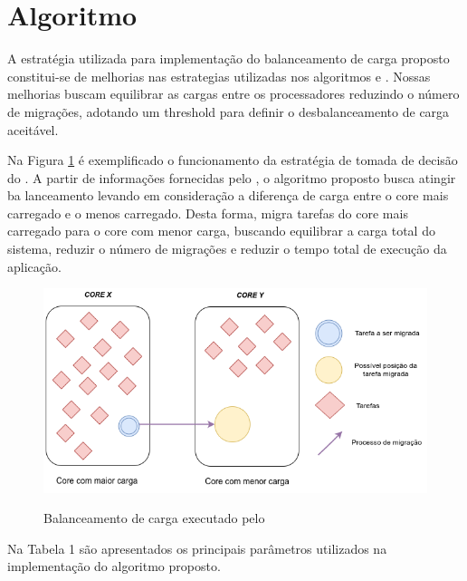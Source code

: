 \section{Algoritmo}

A estratégia utilizada para implementação do balanceamento de carga proposto constitui-se de melhorias nas estrategias utilizadas nos algoritmos \greedylb e . Nossas melhorias buscam equilibrar as cargas entre os processadores reduzindo o número de migrações, adotando um threshold para definir o desbalanceamento de carga aceitável.

Na Figura \ref{img_smartlb_effect} é exemplificado o funcionamento da estratégia de tomada de decisão do \newlb. A partir de informações fornecidas pelo \charm, o algoritmo proposto busca atingir ba lanceamento levando em consideração a diferença de carga entre o core mais carregado e o
menos carregado. Desta forma, migra tarefas do core mais carregado para o core com menor carga, buscando equilibrar a carga total do sistema, reduzir o número de migrações e reduzir o tempo total de execução da aplicação.

\begin{figure}[!htb]
	\centering
	\caption{Balanceamento de carga executado pelo \newlb}
	\centering
	\includegraphics[scale=0.40]{figuras/smartlb_load_balance.png}
	\label{img_smartlb_effect}
	\centering
\end{figure}

Na Tabela 1 são apresentados os principais parâmetros utilizados na implementação do
algoritmo proposto.

